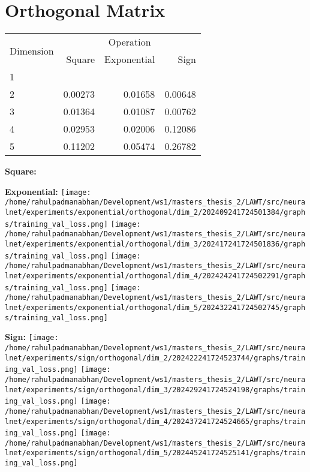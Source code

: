 \documentclass{article}
\begin{document}
\section{Orthogonal Matrix}
\begin{tabular}{@{}lrrr@{}}
\toprule
\multirow{2}{*}{Dimension} & \multicolumn{3}{c}{Operation} \\
\cmidrule(l){2-4}
& Square & Exponential & Sign \\
\midrule
1 & & & \\
2 & 0.00273 & 0.01658 & 0.00648 \\
3 & 0.01364 & 0.01087 & 0.00762 \\
4 & 0.02953 & 0.02006 & 0.12086 \\
5 & 0.11202 & 0.05474 & 0.26782 \\
\bottomrule
\end{tabular}

\textbf{Square:}

\textbf{Exponential:}
\texttt{[image: /home/rahulpadmanabhan/Development/ws1/masters\_thesis\_2/LAWT/src/neuralnet/experiments/exponential/orthogonal/dim\_2/202409241724501384/graphs/training\_val\_loss.png]}
\texttt{[image: /home/rahulpadmanabhan/Development/ws1/masters\_thesis\_2/LAWT/src/neuralnet/experiments/exponential/orthogonal/dim\_3/202417241724501836/graphs/training\_val\_loss.png]}
\texttt{[image: /home/rahulpadmanabhan/Development/ws1/masters\_thesis\_2/LAWT/src/neuralnet/experiments/exponential/orthogonal/dim\_4/202424241724502291/graphs/training\_val\_loss.png]}
\texttt{[image: /home/rahulpadmanabhan/Development/ws1/masters\_thesis\_2/LAWT/src/neuralnet/experiments/exponential/orthogonal/dim\_5/202432241724502745/graphs/training\_val\_loss.png]}

\textbf{Sign:}
\texttt{[image: /home/rahulpadmanabhan/Development/ws1/masters\_thesis\_2/LAWT/src/neuralnet/experiments/sign/orthogonal/dim\_2/202422241724523744/graphs/training\_val\_loss.png]}
\texttt{[image: /home/rahulpadmanabhan/Development/ws1/masters\_thesis\_2/LAWT/src/neuralnet/experiments/sign/orthogonal/dim\_3/202429241724524198/graphs/training\_val\_loss.png]}
\texttt{[image: /home/rahulpadmanabhan/Development/ws1/masters\_thesis\_2/LAWT/src/neuralnet/experiments/sign/orthogonal/dim\_4/202437241724524665/graphs/training\_val\_loss.png]}
\texttt{[image: /home/rahulpadmanabhan/Development/ws1/masters\_thesis\_2/LAWT/src/neuralnet/experiments/sign/orthogonal/dim\_5/202445241724525141/graphs/training\_val\_loss.png]}
\end{document}
